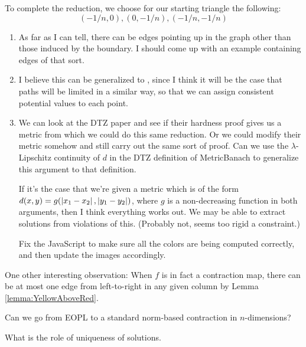     To complete the reduction, we choose for our starting triangle the following: \[(-1/n,0),(0,-1/n),(-1/n,-1/n)\]
  
  \begin{enumerate}
  \item As far as I can tell, there can be edges pointing up in the graph other than those induced by the boundary. I should come up with an example containing edges of that sort. 
  \item I believe this can be generalized to \ThreeDContractionMap, since I think it will be the case that paths will be limited in a similar way, so that we can assign consistent potential values to each point. 
  \item We can look at the DTZ paper and see if their hardness proof gives us a metric from which we could do this same reduction. Or we could modify their metric somehow and still carry out the same sort of proof.
  Can we use the $\lambda$-Lipschitz continuity of $d$ in the DTZ definition of MetricBanach to generalize this argument to that definition. 

  If it's the case that we're given a metric which is of the form $d(x,y) = g(\left| x_1-x_2 \right|,\left| y_1-y_2 \right|)$, where $g$ is a non-decreasing function in both arguments, then I think everything works out. We may be able to extract solutions from violations of this. (Probably not, seems too rigid a constraint.)

  Fix the JavaScript to make sure all the colors are being computed correctly, and then update the images accordingly.

  \end{enumerate}

  One other interesting observation: When $f$ is in fact a contraction map, there can be at most one edge from left-to-right in any given column by Lemma \ref{lemma:YellowAboveRed}. 

  Can we go from EOPL to a standard norm-based contraction in $n$-dimensions?

  What is the role of uniqueness of solutions.
  